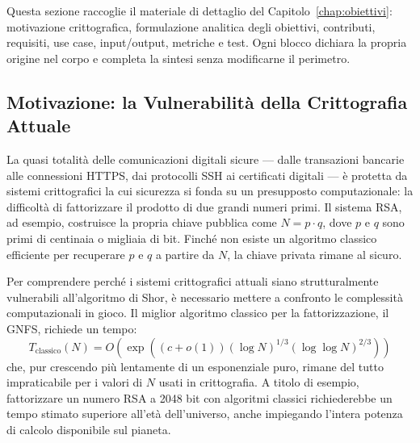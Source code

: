 \begin{onehalfspace}

Questa sezione raccoglie il materiale di dettaglio del Capitolo~\ref{chap:obiettivi}: motivazione crittografica, formulazione analitica degli obiettivi, contributi, requisiti, use case, input/output, metriche e test. Ogni blocco dichiara la propria origine nel corpo e completa la sintesi senza modificarne il perimetro.

\subsection{Motivazione: la Vulnerabilità della Crittografia Attuale}
\label{sec:motivazione}

La quasi totalità delle comunicazioni digitali sicure --- dalle transazioni bancarie alle connessioni \ac{HTTPS}, dai protocolli \ac{SSH} ai certificati digitali --- è protetta da sistemi crittografici la cui sicurezza si fonda su un presupposto computazionale: la difficoltà di fattorizzare il prodotto di due grandi numeri primi. Il sistema \ac{RSA}, ad esempio, costruisce la propria chiave pubblica come $N = p \cdot q$, dove $p$ e $q$ sono primi di centinaia o migliaia di bit. Finché non esiste un algoritmo classico efficiente per recuperare $p$ e $q$ a partire da $N$, la chiave privata rimane al sicuro.

Per comprendere perché i sistemi crittografici attuali siano strutturalmente vulnerabili all'algoritmo di Shor, è necessario mettere a confronto le complessità computazionali in gioco. Il miglior algoritmo classico per la fattorizzazione, il \ac{GNFS}, richiede un tempo:
\begin{equation}
    T_{\text{classico}}(N) = O\!\left(\exp\!\left((c+o(1))(\log N)^{1/3}(\log\log N)^{2/3}\right)\right)
    \label{eq:gnfs_obiettivi}
\end{equation}
che, pur crescendo più lentamente di un esponenziale puro, rimane del tutto impraticabile per i valori di $N$ usati in crittografia. A titolo di esempio, fattorizzare un numero RSA a 2048 bit con algoritmi classici richiederebbe un tempo stimato superiore all'età dell'universo, anche impiegando l'intera potenza di calcolo disponibile sul pianeta.


\end{onehalfspace}
